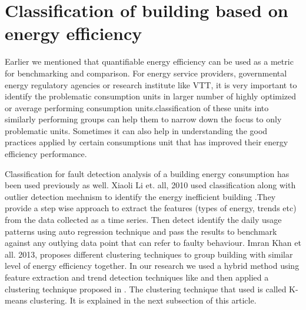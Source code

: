 \section{Classification of building based on energy efficiency}

Earlier we mentioned that quantifiable energy efficiency can be used as a metric for benchmarking and comparison. For energy service providers, governmental energy regulatory agencies or research institute like VTT, it is very important to identify the problematic consumption units in larger number of highly optimized or average performing consumption units.classification of these units into similarly performing groups can help them to narrow down the focus to only problematic units. Sometimes it can also help in understanding the good practices applied by certain consumptions unit that has improved their energy efficiency performance.
  
Classification for fault detection analysis of a building energy consumption has been used previously as well. Xiaoli Li et. all, 2010 used classification along with outlier detection mechnism to identify the energy inefficient building \cite{li2010classification}.They provide a step wise approach to extract the features (types of energy, trends etc) from the data collected as a time series. Then detect identify the daily usage patterns using auto regression technique and pass the results to benchmark against any outlying data point that can refer to faulty behaviour. Imran Khan et all. 2013, proposes different clustering techniques to group building with similar level of energy efficiency together\cite{khan2013fault}. In our research we used a hybrid method using feature extraction and trend detection techniques like \cite{li2010classification} and then applied a clustering technique proposed in \cite{khan2013fault}. The clustering technique that used is called K-means clustering. It is explained in the next subsection of this article.   

 

